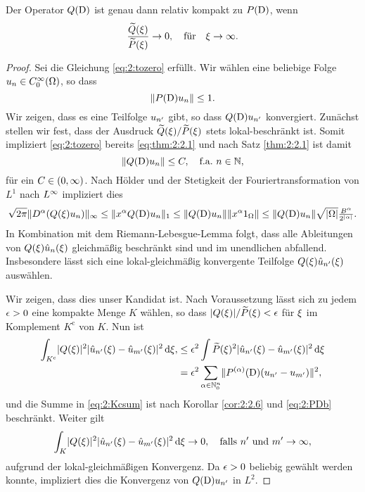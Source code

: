 \begin{thm}
Der Operator $Q(\mathrm D)$ ist genau dann relativ kompakt zu $P(\mathrm D)$,
wenn
\begin{equation}\label{eq:2:tozero}
\frac{\widetilde{Q}(\xi)}{\widetilde{P}(\xi)}\to0,\quad\text{für}\quad\xi\to\infty.
\end{equation}
\end{thm}
\begin{proof}
Sei die Gleichung \eqref{eq:2:tozero} erfüllt.
Wir wählen eine beliebige Folge $u_n\in C^\infty_0(\Omega)$,
so dass 
\begin{equation}\label{eq:2:PDb}
\lVert P(\mathrm D)u_n\rVert\leq1.
\end{equation}
Wir zeigen, dass es eine Teilfolge $u_{n^\prime}$ gibt,
so dass $Q(\mathrm D)u_{n^\prime}$ konvergiert.
Zunächst stellen wir fest, dass der Ausdruck $\widetilde{Q}(\xi)/\widetilde{P}(\xi)$
stets lokal-beschränkt ist.
Somit impliziert \eqref{eq:2:tozero} bereits \eqref{eq:thm:2:2.1}
und nach Satz \ref{thm:2:2.1} ist damit
\begin{equation}
\lVert Q(\mathrm D)u_n\rVert\leq C,
\quad\text{f.a.}~n\in\mathbb N,
\end{equation}
für ein $C\in(0,\infty)$.
Nach Hölder und der Stetigkeit der Fouriertransformation
von $L^1$ nach $L^\infty$ impliziert dies
\begin{equation}
\sqrt{2\pi}\lVert D^\alpha(Q(\xi)u_n)\rVert_\infty\leq\lVert x^\alpha Q(\mathrm D)u_n\rVert_1\leq\lVert Q(\mathrm D)u_n\rVert\lVert x^\alpha1_\Omega\rVert
\leq\lVert Q(\mathrm D)u_n\rVert\sqrt{\lvert\Omega\rvert}\tfrac{B^\alpha}{2^{\lvert\alpha\rvert}}.
\end{equation}
In Kombination mit dem Riemann-Lebesgue-Lemma folgt,
dass alle Ableitungen von $Q(\xi)\hat{u}_n(\xi)$
gleichmäßig beschränkt sind und im unendlichen abfallend.
Insbesondere lässt sich eine lokal-gleichmäßig konvergente Teilfolge $Q(\xi)\hat{u}_{n^\prime}(\xi)$ auswählen.

Wir zeigen, dass dies unser Kandidat ist.
Nach Voraussetzung lässt sich zu jedem $\epsilon>0$ eine kompakte Menge $K$ wählen,
so dass $\lvert Q(\xi)\rvert/\widetilde{P}(\xi)<\epsilon$ für $\xi$ im Komplement $K^{\mathrm c}$ von $K$.
Nun ist
\begin{align}
\int_{K^{\mathrm c}}\lvert Q(\xi)\rvert^2\lvert\hat{u}_{n^\prime}(\xi)-\hat{u}_{m^\prime}(\xi)\rvert^2\,\mathrm d \xi,
&\leq\epsilon^2\int\widetilde{P}(\xi)^2\lvert\hat{u}_{n^\prime}(\xi)-\hat{u}_{m^\prime}(\xi)\rvert^2\,\mathrm d \xi\\
&=\epsilon^2\sum_{\alpha\in\mathbb N^n_0}\lVert P^{(\alpha)}(\mathrm D)(u_{n^\prime}-u_{m^\prime})\rVert^2,\label{eq:2:Kcsum}
\end{align}
und die Summe in \eqref{eq:2:Kcsum} ist nach Korollar \ref{cor:2:2.6}
und \eqref{eq:2:PDb} beschränkt.
Weiter gilt
\begin{equation}
\int_K\lvert Q(\xi)\rvert^2\lvert\hat{u}_{n^\prime}(\xi)-\hat{u}_{m^\prime}(\xi)\rvert^2\,\mathrm d \xi\to0,
\quad\text{falls}~n^\prime~\text{und}~m^\prime\to\infty,
\end{equation}
aufgrund der lokal-gleichmäßigen Konvergenz.
Da $\epsilon>0$ beliebig gewählt werden konnte,
impliziert dies die Konvergenz von $Q(\mathrm D)u_{n^\prime}$ in $L^2$.


\end{proof}
